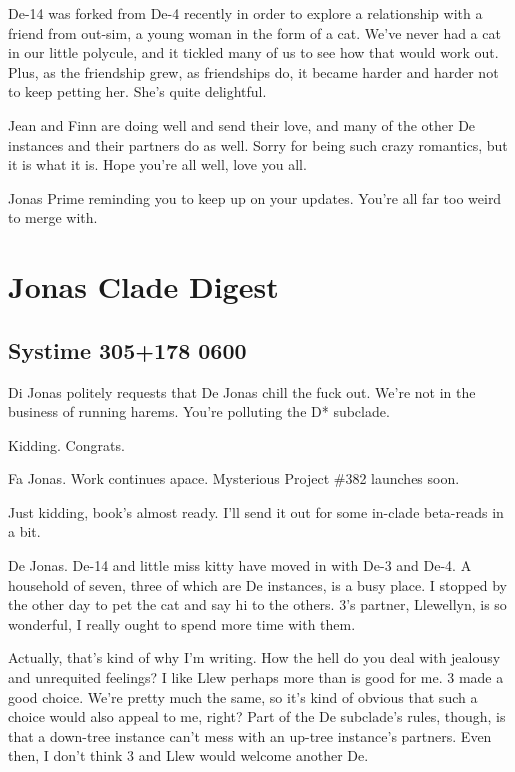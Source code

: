 De-14 was forked from De-4 recently in order to explore a relationship with a friend from out-sim, a young woman in the form of a cat. We've never had a cat in our little polycule, and it tickled many of us to see how that would work out. Plus, as the friendship grew, as friendships do, it became harder and harder not to keep petting her. She's quite delightful.

Jean and Finn are doing well and send their love, and many of the other De instances and their partners do as well. Sorry for being such crazy romantics, but it is what it is. Hope you're all well, love you all.

\secdiv{}

\noindent Jonas Prime reminding you to keep up on your updates. You're all far too weird to merge with.

\newpage
\hypertarget{jonas-clade-digest-1}{%
\section*{Jonas Clade Digest}\label{jonas-clade-digest-1}}

\hypertarget{systime-305178-0600}{%
\subsection*{Systime 305+178 0600}\label{systime-305178-0600}}

Di Jonas politely requests that De Jonas chill the fuck out. We're not in the business of running harems. You're polluting the D* subclade.

Kidding. Congrats.

\secdiv{}

\noindent Fa Jonas. Work continues apace. Mysterious Project \#382 launches soon.

Just kidding, book's almost ready. I'll send it out for some in-clade beta-reads in a bit.

\secdiv{}

\noindent De Jonas. De-14 and little miss kitty have moved in with De-3 and De-4. A household of seven, three of which are De instances, is a busy place. I stopped by the other day to pet the cat and say hi to the others. 3's partner, Llewellyn, is so wonderful, I really ought to spend more time with them.

Actually, that's kind of why I'm writing. How the hell do you deal with jealousy and unrequited feelings? I like Llew perhaps more than is good for me. 3 made a good choice. We're pretty much the same, so it's kind of obvious that such a choice would also appeal to me, right? Part of the De subclade's rules, though, is that a down-tree instance can't mess with an up-tree instance's partners. Even then, I don't think 3 and Llew would welcome another De.

